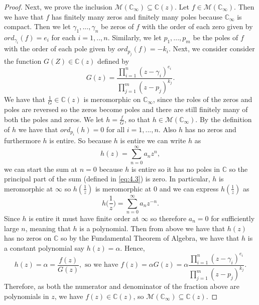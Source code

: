 \documentclass{article}
\begin{document}
\begin{proof}
 Next, we prove the inclusion $\mathcal{M}(\mathbb{C}_{\infty})\subseteq\mathbb{C}(z)$.
 Let $f\in\mathcal{M}(\mathbb{C}_\infty).$ Then we have that $f$ has finitely many zeros and finitely many poles because $\mathbb{C}_{\infty}$ is compact. Then we let $\gamma_{1},...,\gamma_{n}$ be zeros of $f$ with the order of each zero given by $ord_{\gamma_{i}}(f)=e_{i}$ for each $i=1,..,n$. Similarly, we let $p_{1},...,p_{m}$ be the poles of $f$ with the order of each pole given by $ord_{p_{j}}(f)=-k_{i}$.
 Next, we consider consider the function $G(Z)\in\mathbb{C}(z)$ defined by \[G(z)=\frac{\displaystyle\prod_{i=1}^{n}(z-\gamma_{i})^{e_{i}}}{\displaystyle \prod_{j=1}^{m}(z-p_{j})^{k_{j}}}.\]
 We have that $\frac{1}{G}\in\mathbb{C}(z)$ is meromorphic on  $\mathbb{C}_{\infty}$, since the roles of the zeros and poles are reversed so the zeros become poles and there are still finitely many of both the poles and zeros. We let $h=\frac{f}{G}$, so that $h\in\mathcal{M}(\mathbb{C}_{\infty})$. By the definition of $h$ we have that $ord_{p_{i}}(h)=0$ for all $i=1,...,n$. Also $h$ has no zeros and furthermore $h$ is entire. So because $h$ is entire we can write $h$ as \[h(z)=\sum_{n=0}^{\infty}a_{n}z^{n},\] we can start the sum at $n=0$ because $h$ is entire so it has no poles in $\mathbb{C}$ so the principal part of the sum (defined in \eqref{eq:4.3}) is zero. In particular, $h$ is meromorphic at $\infty$ so $h(\frac{1}{z})$ is meromorphic at $0$ and we can express $h(\frac{1}{z})$ as \[h\Big(\frac{1}{z}\Big)=\sum_{n=0}^{\infty} a_{n}z^{-n}.\] Since $h$ is entire it must have finite order at $\infty$ so therefore $a_{n}=0$ for sufficiently large $n$, meaning that $h$ is a polynomial. Then from above we have that $h(z)$ has no zeros on $\mathbb{C}$ so by the Fundamental Theorem of Algebra\cite[p.~97]{CA}, we have that $h$ is a constant polynomial say $h(z)=\alpha$.
 Hence, \[h(z)=\alpha=\frac{f(z)}{G(z)}, \text{ so we have } f(z)=\alpha G(z)= \alpha \frac{\displaystyle\prod_{i=1}^{n}(z-\gamma_{i})^{e_{i}}}{\displaystyle\prod_{j=1}^{m} (z-p_{j})^{k_{j}}}.\]
 Therefore, as both the numerator and denominator of the fraction above are polynomials in $z$, we have $f(z)\in\mathbb{C}(z)$, so $\mathcal{M}(\mathbb{C}_{\infty})\subseteq\mathbb{C}(z)$.
 \end{proof}
\end{document}
